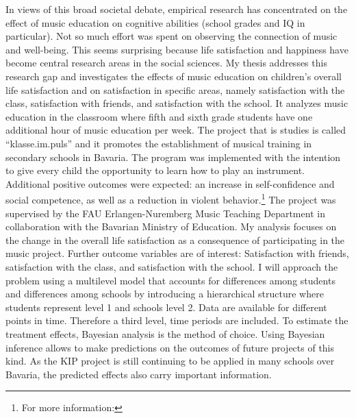 \documentclass[a4, 12pt]{article}
\let\rmarkdownfootnote\footnote%
\def\footnote{\protect\rmarkdownfootnote}
\begin{document}
In views of this broad societal debate, empirical research has concentrated on the effect of music education on cognitive abilities (school grades and IQ in particular). Not so much effort was spent on observing the connection of music and well-being. This seems surprising because life satisfaction and happiness have become central research areas in the social sciences. My thesis addresses this research gap and investigates the effects of music education on children's overall life satisfaction and on satisfaction in specific areas, namely satisfaction with the class, satisfaction with friends, and satisfaction with the school. It analyzes music education in the classroom where fifth and sixth grade students have one additional hour of music education per week. The project that is studies is called ``klasse.im.puls'' and it promotes the establishment of musical training in secondary schools in Bavaria. The program was implemented with the intention to give every child the opportunity to learn how to play an instrument. Additional positive outcomes were expected: an increase in self-confidence and social competence, as well as a reduction in violent behavior.\footnote{For more information:} The project was supervised by the FAU Erlangen-Nuremberg Music Teaching Department in collaboration with the Bavarian Ministry of Education.
My analysis focuses on the change in the overall life satisfaction as a consequence of participating in the music project. Further outcome variables are of interest: Satisfaction with friends, satisfaction with the class, and satisfaction with the school. I will approach the problem using a multilevel model that accounts for differences among students and differences among schools by introducing a hierarchical structure where students represent level 1 and schools level 2. Data are available for different points in time. Therefore a third level, time periods are included. To estimate the treatment effects, Bayesian analysis is the method of choice. Using Bayesian inference allows to make predictions on the outcomes of future projects of this kind. As the KIP project is still continuing to be applied in many schools over Bavaria, the predicted effects also carry important information.
\end{document}
